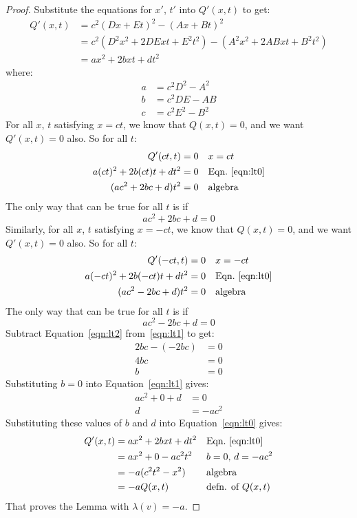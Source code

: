 \documentclass[a4paper]{article}
\theoremstyle{plain}
\theoremstyle{definition}
\begin{document}
\begin{proof}
Substitute the equations for $x'$, $t'$ into $Q'(x,t)$ to get:
\begin{align}
Q'(x,t)
  & = c^2 (Dx + Et)^2 - (Ax+Bt)^2 \nonumber \\
  & = c^2 (D^2x^2 + 2DExt + E^2t^2) - (A^2x^2 + 2ABxt + B^2t^2) \nonumber \\
  & = ax^2 + 2bxt + dt^2 \label{eqn:lt0}
\end{align}
where:
\begin{align*}
  a & = c^2 D^2 - A^2 \\
  b & = c^2 DE - AB \\
  c & = c^2 E^2 - B^2
\end{align*}
For all $x$, $t$ satisfying $x=ct$, we know that $Q(x,t)=0$,
and we want $Q'(x,t)=0$ also.
So for all $t$:
\begin{align*}
Q'(ct,t) & = 0 & & \text{$x=ct$} \\
a(ct)^2 + 2b(ct)t + dt^2 & = 0 & & \text{Eqn.~\eqref{eqn:lt0}} \\
(ac^2 + 2bc + d) t^2 & = 0 & & \text{algebra}
\end{align*}
The only way that can be true for all $t$ is if
\begin{equation}
ac^2 + 2bc + d = 0 \label{eqn:lt1}
\end{equation}
Similarly, for all $x$, $t$ satisfying $x=-ct$, we know that $Q(x,t)=0$,
and we want $Q'(x,t)=0$ also.
So for all $t$:
\begin{align*}
Q'(-ct,t) & = 0 & & \text{$x=-ct$} \\
a(-ct)^2 + 2b(-ct)t + dt^2 & = 0 & & \text{Eqn.~\eqref{eqn:lt0}} \\
(ac^2 - 2bc + d) t^2 & = 0 & & \text{algebra}
\end{align*}
The only way that can be true for all $t$ is if
\begin{equation}
ac^2 - 2bc + d = 0 \label{eqn:lt2}
\end{equation}
Subtract Equation~\eqref{eqn:lt2} from~\eqref{eqn:lt1} to get:
\begin{align*}
2bc - (-2bc) & = 0 \\
4bc & = 0 \\
b & = 0
\end{align*}
Substituting $b=0$ into Equation~\eqref{eqn:lt1} gives:
\begin{align*}
ac^2 + 0 + d & = 0 \\
d & = -ac^2
\end{align*}
Substituting these values of $b$ and $d$ into Equation~\eqref{eqn:lt0}
gives:
\begin{align*}
Q'(x,t)
  & = ax^2 + 2bxt + dt^2 & & \text{Eqn.~\eqref{eqn:lt0}} \\
  & = ax^2 + 0 - ac^2t^2 & & \text{$b=0$, $d=-ac^2$} \\
  & = -a(c^2t^2 - x^2) & & \text{algebra} \\
  & = -a Q(x,t) & & \text{defn. of $Q(x,t)$}
\end{align*}
That proves the Lemma with $\lambda(v) = -a$.
\end{proof}
\end{document}
